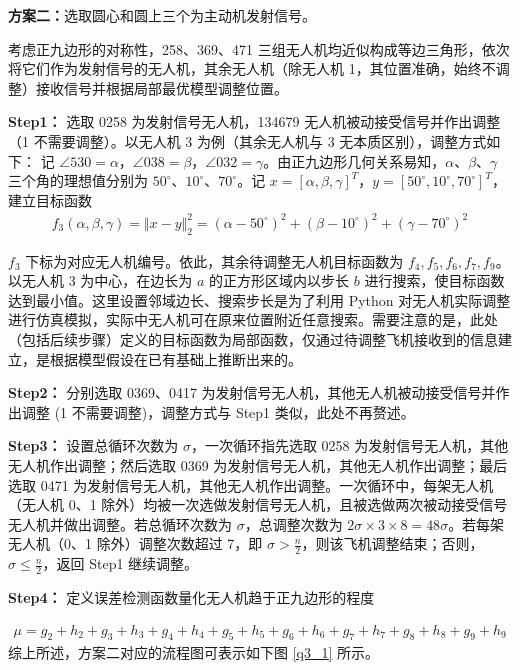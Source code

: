 \documentclass[withoutpreface,bwprint]{cumcmthesis} %
\begin{document}
\noindent \textbf{方案二：}选取圆心和圆上三个为主动机发射信号。

考虑正九边形的对称性，258、369、471 三组无人机均近似构成等边三角形，依次将它们作为发射信号的无人机，其余无人机（除无人机 1，其位置准确，始终不调整）接收信号并根据局部最优模型调整位置。

\textbf{Step1：} 选取 0258 为发射信号无人机，134679 无人机被动接受信号并作出调整（1 不需要调整）。以无人机 3 为例（其余无人机与 3 无本质区别），调整方式如下：
记 $\angle 530 = \alpha$，$\angle 038 = \beta$，$\angle 032 = \gamma$。由正九边形几何关系易知，$\alpha$、$\beta$、$\gamma$ 三个角的理想值分别为 $50^\circ$、$10^\circ$、$70^\circ$。记 $x = [\alpha, \beta, \gamma]^T$，$y = [50^\circ, 10^\circ, 70^\circ]^T$，建立目标函数
\begin{align}
    f_3(\alpha, \beta, \gamma) = \Vert{x} - {y}\Vert_2^2 = (\alpha - 50^\circ)^2 + (\beta - 10^\circ)^2 + (\gamma - 70^\circ)^2
\end{align}

$f_3$ 下标为对应无人机编号。依此，其余待调整无人机目标函数为 $f_4, f_5, f_6, f_7, f_9$。以无人机 3 为中心，在边长为 $a$ 的正方形区域内以步长 $b$ 进行搜索，使目标函数达到最小值。这里设置邻域边长、搜索步长是为了利用 Python 对无人机实际调整进行仿真模拟，实际中无人机可在原来位置附近任意搜索。需要注意的是，此处（包括后续步骤）定义的目标函数为局部函数，仅通过待调整飞机接收到的信息建立，是根据模型假设在已有基础上推断出来的。

\textbf{Step2：} 分别选取 0369、0417 为发射信号无人机，其他无人机被动接受信号并作出调整 (1 不需要调整)，调整方式与 Step1 类似，此处不再赘述。

\textbf{Step3：} 设置总循环次数为 $\sigma$，一次循环指先选取 0258 为发射信号无人机，其他无人机作出调整；然后选取 0369 为发射信号无人机，其他无人机作出调整；最后选取 0471 为发射信号无人机，其他无人机作出调整。一次循环中，每架无人机（无人机 0、1 除外）均被一次选做发射信号无人机，且被选做两次被动接受信号无人机并做出调整。若总循环次数为 $\sigma$，总调整次数为 $2\sigma \times 3 \times 8 = 48\sigma$。若每架无人机（0、1 除外）调整次数超过 7，即 $\sigma > \frac{n}{2}$，则该飞机调整结束；否则，$\sigma \leq \frac{n}{2}$，返回 Step1 继续调整。

\textbf{Step4：} 定义误差检测函数量化无人机趋于正九边形的程度

\begin{align}
\mu = g_2 + h_2 + g_3 + h_3 + g_4 + h_4 + g_5 + h_5 + g_6 + h_6 + g_7 + h_7 + g_8 + h_8 + g_9 + h_9
\end{align}
综上所述，方案二对应的流程图可表示如下图 \ref{q3_1} 所示。
\end{document}
